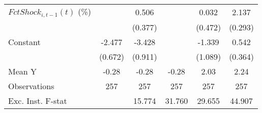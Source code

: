 {\begin{tabular}{l*{5}{c}}
\addlinespace
$ FctShock_{i,t-1}(t)$ (\%)&                     &       0.506         &                     &       0.032         &       2.137\sym{***}\\
                    &                     &     (0.377)         &                     &     (0.472)         &     (0.293)         \\
\addlinespace
Constant            &      -2.477\sym{***}&      -3.428\sym{***}&                     &      -1.339         &       0.542         \\
                    &     (0.672)         &     (0.911)         &                     &     (1.089)         &     (0.364)         \\
\midrule
Mean Y              &       -0.28         &       -0.28         &       -0.28         &        2.03         &        2.24         \\
Observations        &         257         &         257         &         257         &         257         &         257         \\
Exc. Inst. F-stat   &                     &      15.774         &      31.760         &      29.655         &      44.907         \\
\bottomrule
\end{tabular}
}
